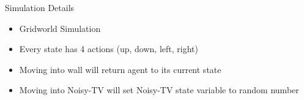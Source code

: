 	
	\begin{frame}[fragile]{Simulation Details}
		\begin{itemize}
			\item {Gridworld Simulation}
			\item {Every state has 4 actions (up, down, left, right)}
			\item {Moving into wall will return agent to its current state}
			\item {Moving into Noisy-TV will set Noisy-TV state variable to random number}
		\end{itemize}
	\end{frame}
	
